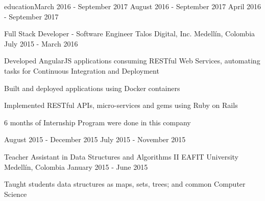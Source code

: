 \begin{cventries}
{\begin{cvsubentries}
{                     education{\dotsep}}{March 2016 - September 2017}{}
                      {August 2016 - September 2017}{}
                      {April 2016 - September 2017}{}
      \end{cvsubentries}
    }
  \cventry
    {Full Stack Developer - Software Engineer}
    {Talos Digital, Inc.}
    {Medellín, Colombia}
    {July 2015 - March 2016}
    {
      \begin{cvitems}
        \item {Developed AngularJS applications consuming RESTful Web Services, automating tasks
               for Continuous Integration and Deployment}
        \item {Built and deployed applications using Docker containers}
        \item {Implemented RESTful APIs, micro-services and gems using Ruby on Rails}
        \item {6 months of Internship Program were done in this company}
      \end{cvitems}
      \begin{cvsubentries}
                      {August 2015 - December 2015}{}
                      {July 2015 - November 2015}{}
      \end{cvsubentries}
    }
  \cventry
    {Teacher Assistant in Data Structures and Algorithms II}
    {EAFIT University}
    {Medellín, Colombia}
    {January 2015 - June 2015}
    {
      \begin{cvitems}
        \item {Taught students data structures as maps, sets, trees; and common Computer Science
}
\end{cvitems}}
\end{cventries}

